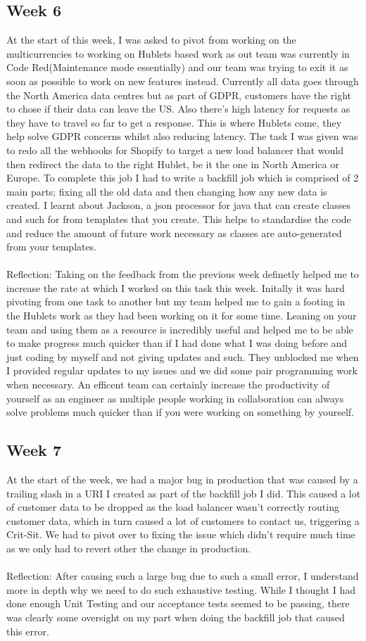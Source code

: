 \documentclass[12pt]{article} %
\begin{document}
\subsection{Week 6}
At the start of this week, I was asked to pivot from working on the multicurrencies to working on Hublets based work as out team was currently in Code Red(Maintenance mode essentially) and our team was trying to exit it as soon as possible to work on new features instead. Currently all data goes through the North America data centres but as part of GDPR, customers have the right to chose if their data can leave the US. Also there's high latency for requests as they have to travel so far to get a response. This is where Hublets come, they help solve GDPR concerns whilst also reducing latency. The task I was given was to redo all the webhooks for Shopify to target a new load balancer that would then redirect the data to the right Hublet, be it the one in North America or Europe. To complete this job I had to write a backfill job which is comprised of 2 main parts; fixing all the old data and then changing how any new data is created. I learnt about Jackson, a json processor for java that can create classes and such for from templates that you create. This helps to standardise the code and reduce the amount of future work necessary as classes are auto-generated from your templates. 
\\\\
Reflection: Taking on the feedback from the previous week definetly helped me to increase the rate at which I worked on this task this week. Initally it was hard pivoting from one task to another but my team helped me to gain a footing in the Hublets work as they had been working on it for some time. Leaning on your team and using them as a resource is incredibly useful and helped me to be able to make progress much quicker than if I had done what I was doing before and just coding by myself and not giving updates and such. They unblocked me when I provided regular updates to my issues and we did some pair programming work when necessary. An efficent team can certainly increase the productivity of yourself as an engineer as multiple people working in collaboration can always solve problems much quicker than if you were working on something by yourself.
\subsection{Week 7}
At the start of the week, we had a major bug in production that was caused by a trailing slash in a URI I created as part of the backfill job I did.  This caused a lot of customer data to be dropped as the load balancer wasn't correctly routing customer data,  which in turn caused a lot of customers to contact us, triggering a Crit-Sit.  We had to pivot over to fixing the issue which didn't require much time as we only had to revert other the change in production.
\\\\ Reflection: After causing such a large bug due to such a small error,  I understand more in depth why we need to do such exhaustive testing.  While I thought I had done enough Unit Testing and our acceptance tests seemed to be passing,  there was clearly some oversight on my part when doing the backfill job that caused this error.
\end{document}
